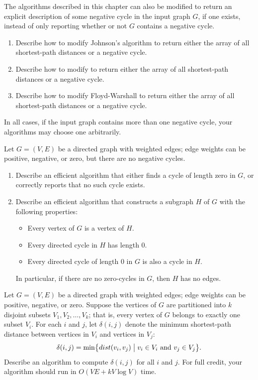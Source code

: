 \begin{exercises}
\item The algorithms described in this chapter can also be modified to return an explicit description of some negative cycle in the input graph $G$, if one exists, instead of only reporting whether or not $G$ contains a negative cycle.
\begin{enumerate}
\item Describe how to modify Johnson’s algorithm to return either the array of all shortest-path distances or a negative cycle.
\item Describe how to modify  to return either the array of all shortest-path distances or a negative cycle.
\item Describe how to modify Floyd-Warshall to return either the array of all shortest-path distances or a negative cycle.
\end{enumerate}
In all cases, if the input graph contains more than one negative cycle, your algorithms may choose one arbitrarily.

\item Let $G = (V, E)$ be a directed graph with weighted edges; edge weights can be positive, negative, or zero, but there are no negative cycles.
\begin{enumerate}
\item Describe an efficient algorithm that either finds a cycle of length zero in $G$, or correctly reports that no such cycle exists.
\item Describe an efficient algorithm that constructs a subgraph $H$ of $G$ with the following properties:
\begin{itemize}
\item Every vertex of $G$ is a vertex of $H$.
\item Every directed cycle in $H$ has length $0$.
\item Every directed cycle of length $0$ in $G$ is also a cycle in $H$.
\end{itemize}
In particular, if there are no zero-cycles in $G$, then $H$ has no edges.
\end{enumerate}

\item Let $G = (V, E)$ be a directed graph with weighted edges; edge weights can be positive, negative, or zero.
Suppose the vertices of $G$ are partitioned into $k$ disjoint subsets $V_1, V_2, \dots, V_k$; that is, every vertex of $G$ belongs to exactly one subset $V_i$.
For each $i$ and $j$, let $\delta(i, j)$ denote the minimum shortest-path distance between vertices in $V_i$ and vertices in $V_j$:
\[
\delta(i, j) = \min\bigl\{dist(v_i, v_j) \bigm| v_i \in V_i \text{ and } v_j \in V_j\bigr\}.
\]
Describe an algorithm to compute $\delta(i, j)$ for all $i$ and $j$.
For full credit, your algorithm should run in $O(VE + kV \log V)$ time.


\end{exercises}
